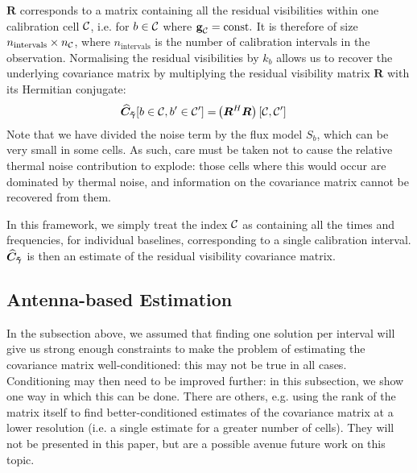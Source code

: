 \pg
$\bm{R}$ corresponds to a matrix containing all the residual visibilities within one calibration cell $\mathcal{C}$, i.e. for $b \in \mathcal{C}$ where $\textbf{g}_{\mathcal{C}} = \mathrm{const.}$ {It is therefore of size $n_{\mathrm{intervals}}\times n_{\mathcal{C}}$, where $n_{\mathrm{intervals}}$ is the number of calibration intervals in the observation}. Normalising the residual visibilities by $k_b$ allows us to recover the underlying covariance matrix by multiplying the residual visibility matrix $\bm{R}$ with its Hermitian conjugate:
\begin{align}
\widehat{\bm{C}}_{\bm{\tilde{\gamma}}}[b\in\mathcal{C},b'\in\mathcal{C}']             =& \left(\bm{R}^H \bm{R}\right)[\mathcal{C},\mathcal{C}']
\end{align}
Note that we have divided the noise term by the flux model $S_b$, which can be very small in some cells. As such, care must be taken not to cause the relative thermal noise contribution to explode: those cells where this would occur are dominated by thermal noise, and information on the covariance matrix cannot be recovered from them.

\pg
In this framework, we simply treat the index $\mathcal{C}$ as containing all the times and frequencies, for individual baselines, corresponding to a single calibration interval. $\widehat{\bm{C}}_{\bm{\tilde{\gamma}}}$ is then an estimate of the residual visibility covariance matrix.



\subsection{Antenna-based Estimation}

In the subsection above, we assume{d} that finding one solution per interval will give us strong enough constraints to make the problem {of estimating the covariance matrix} well-conditioned: this may not be true in all cases. Conditioning may then need to be improved further: in this subsection, we show one way in which this can be done. There are others, e.g. using the rank of the matrix itself to find better-conditioned estimates of the covariance matrix at a lower resolution (i.e. a single estimate for a greater number of cells). They will not be presented in this paper, but are a possible avenue future work on this topic.

